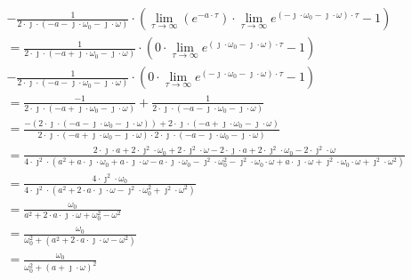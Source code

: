 \begin{task}
\begin{align*}
&-\frac{1}{2 \cdot \jmath \cdot (-a - \jmath \cdot \omega_{0} -\jmath \cdot \omega)} \cdot \left(\lim_{\tau \rightarrow \infty }
( e^{-a \cdot \tau})\cdot \lim_{\tau \rightarrow \infty } e^{(-\jmath \cdot \omega_{0} -\jmath \cdot \omega) \cdot \tau}-1\right)\\
&=\frac{1}{2 \cdot \jmath \cdot (-a + \jmath \cdot \omega_{0} -\jmath \cdot \omega)} \cdot \left(0 \cdot \lim_{\tau \rightarrow \infty } e^{(\jmath \cdot \omega_{0} -\jmath \cdot \omega) \cdot \tau}-1\right)\\
&-\frac{1}{2 \cdot \jmath \cdot (-a - \jmath \cdot \omega_{0} -\jmath \cdot \omega)} \cdot \left(0 \cdot \lim_{\tau \rightarrow \infty } e^{(-\jmath \cdot \omega_{0} -\jmath \cdot \omega) \cdot \tau}-1\right)\\
&=\frac{-1}{2 \cdot \jmath \cdot (-a + \jmath \cdot \omega_{0} -\jmath \cdot \omega)}+\frac{1}{2 \cdot \jmath \cdot (-a - \jmath \cdot \omega_{0} -\jmath \cdot \omega)}\\
&=\frac{-(2 \cdot \jmath \cdot (-a - \jmath \cdot \omega_{0} -\jmath \cdot \omega))+2 \cdot \jmath \cdot (-a + \jmath \cdot \omega_{0} -\jmath \cdot \omega)}{2 \cdot \jmath \cdot (-a + \jmath \cdot \omega_{0} -\jmath \cdot \omega) \cdot 2 \cdot \jmath \cdot (-a - \jmath \cdot \omega_{0} -\jmath \cdot \omega)}\\
&=\frac{2 \cdot \jmath \cdot a + 2 \cdot \jmath^{2} \cdot \omega_{0} + 2 \cdot \jmath^{2} \cdot \omega - 2 \cdot \jmath \cdot a + 2 \cdot \jmath^{2} \cdot \omega_{0} - 2 \cdot \jmath^{2} \cdot \omega}
{4 \cdot \jmath^{2} \cdot 
	(a^{2}+ a \cdot \jmath \cdot \omega_{0}+ a \cdot \jmath \cdot \omega
-a \cdot \jmath \cdot \omega_{0}- \jmath^{2} \cdot \omega_{0}^{2}- \jmath^{2} \cdot \omega_{0} \cdot \omega
+a \cdot \jmath \cdot \omega+ \jmath^{2} \cdot \omega_{0} \cdot \omega + \jmath^{2} \cdot \omega^{2})}\\
&=\frac{4 \cdot \jmath^{2} \cdot \omega_{0}}
{4 \cdot \jmath^{2} \cdot (a^{2} + 2 \cdot a \cdot \jmath \cdot \omega - \jmath^{2} \cdot \omega_{0}^{2} + \jmath^{2} \cdot \omega^{2})}\\
&=\frac{\omega_{0}}{a^{2} + 2 \cdot a \cdot \jmath \cdot \omega + \omega_{0}^{2} - \omega^{2}}\\
&=\frac{\omega_{0}}{\omega_{0}^{2} + (a^{2} + 2 \cdot a \cdot \jmath \cdot \omega - \omega^{2})}\\
&=\frac{\omega_{0}}{\omega_{0}^{2} + (a + \jmath \cdot \omega)^{2}}\\
\end{align*}


\end{task}
